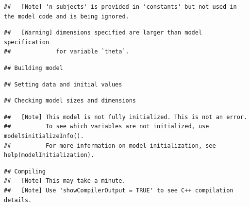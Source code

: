 \documentclass[
]{article}
\begin{document}
\begin{verbatim}
##   [Note] 'n_subjects' is provided in 'constants' but not used in the model code and is being ignored.
\end{verbatim}

\begin{verbatim}
##   [Warning] dimensions specified are larger than model specification
##             for variable `theta`.
\end{verbatim}

\begin{verbatim}
## Building model
\end{verbatim}

\begin{verbatim}
## Setting data and initial values
\end{verbatim}

\begin{verbatim}
## Checking model sizes and dimensions
\end{verbatim}

\begin{verbatim}
##   [Note] This model is not fully initialized. This is not an error.
##          To see which variables are not initialized, use model$initializeInfo().
##          For more information on model initialization, see help(modelInitialization).
\end{verbatim}

\begin{verbatim}
## Compiling
##   [Note] This may take a minute.
##   [Note] Use 'showCompilerOutput = TRUE' to see C++ compilation details.
\end{verbatim}
\end{document}
